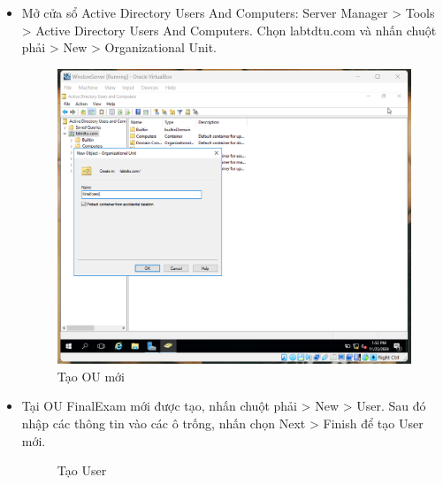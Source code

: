   \begin{itemize}
      \item Mở cửa sổ Active Directory Users And Computers: Server Manager > Tools > Active Directory Users And Computers. Chọn labtdtu.com và nhấn chuột phải > New > Organizational Unit.

    \begin{figure}[htbp]
        \centering
        \includegraphics[width=0.5\linewidth]{RemoteAccessVPNimg/createOU.png}
        \caption{Tạo OU mới}
    \end{figure}
      
    \item Tại OU FinalExam mới được tạo, nhấn chuột phải > New > User. Sau đó nhập các thông tin vào các ô trống, nhấn chọn Next > Finish để tạo User mới.
\newpage
    \begin{figure}[htbp]
            \hfill
            \hfill
            \caption{Tạo User}
        \end{figure}

 \end{itemize}

